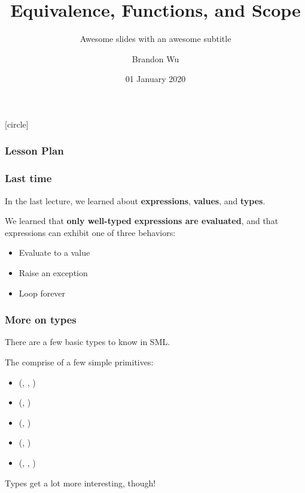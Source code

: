 \documentclass[aspectratio=169]{beamer}
\title{Equivalence, Functions, and Scope} %
\subtitle{Awesome slides with an awesome subtitle} %
\date{01 January 2020} %
\author{Brandon Wu} %
\newif\ifcolorlambda
\begin{document}
\ifweb
    \renewcommand{\pause}{}
\fi

[circle]

{
\begin{frame}[plain]
    \colorlambdatrue
    \titlepage
\end{frame}
}

\begin{frame}[fragile]
  \frametitle{Lesson Plan}

  \tableofcontents
\end{frame}

\begin{frame}[fragile]
  \frametitle{Last time}

  In the last lecture, we learned about \textbf{expressions}, \textbf{values}, and \textbf{types}.

  \vspace{5pt}

  We learned that \textbf{only well-typed expressions are evaluated}, and that expressions can 
  exhibit one of three behaviors:

  \vspace{\fill}

  \begin{itemize}
    \item Evaluate to a value
    \item Raise an exception
    \item Loop forever
  \end{itemize}
\end{frame}


\begin{frame}[fragile]
  \frametitle{More on types}

  There are a few basic types to know in SML.

  \vspace{10pt}

  The  comprise of a few simple primitives:

  \vspace{5pt}

  \begin{itemize}
    \item {} (, , )
    \item {} (, )
    \item {} (, )
    \item {} (, )
    \item {} (, , )
  \end{itemize}

  \vspace{\fill}

  Types get a lot more interesting, though!
\end{frame}
\end{document}
